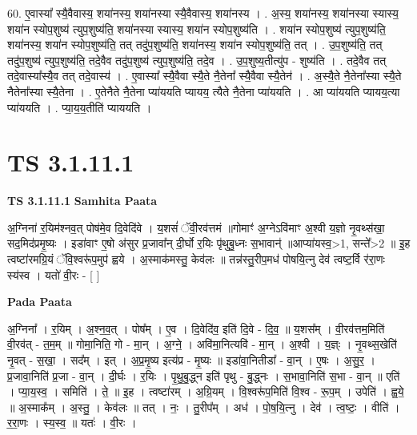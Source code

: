 \documentclass[17pt]{extarticle}
\begin{document}
60. ए॒वास्या᳚ स्यै॒वैवास्य॒ शया॑नस्य॒ शया॑नस्या स्यै॒वैवास्य॒ शया॑नस्य । . अ॒स्य॒ शया॑नस्य॒ शया॑नस्या स्यास्य॒ शया॑न स्योप॒शुष्य॑ त्युप॒शुष्य॑ति॒ शया॑नस्या स्यास्य॒ शया॑न स्योप॒शुष्य॑ति । . शया॑न स्योप॒शुष्य॑ त्युप॒शुष्य॑ति॒ शया॑नस्य॒ शया॑न स्योप॒शुष्य॑ति॒ तत् तदु॑प॒शुष्य॑ति॒ शया॑नस्य॒ शया॑न स्योप॒शुष्य॑ति॒ तत् । . उ॒प॒शुष्य॑ति॒ तत् तदु॑प॒शुष्य॑ त्युप॒शुष्य॑ति॒ तदे॒वैव तदु॑प॒शुष्य॑ त्युप॒शुष्य॑ति॒ तदे॒व । . उ॒प॒शुष्य॒तीत्यु॑प - शुष्य॑ति । . तदे॒वैव तत् तदे॒वास्या᳚स्यै॒व तत् तदे॒वास्य॑ । . ए॒वास्या᳚ स्यै॒वैवा स्यै॒ते नै॒तेना᳚ स्यै॒वैवा स्यै॒तेन॑ । . अ॒स्यै॒ते नै॒तेना᳚स्या स्यै॒ते नैतेना᳚स्या स्यै॒तेना । . ए॒तेनैते नै॒तेना प्या॑ययति प्यायय॒ त्यैते नै॒तेना प्या॑ययति । . आ प्या॑ययति प्यायय॒त्या प्या॑ययति । . प्या॒य॒य॒तीति॑ प्याययति । \newline
\pagebreak
{}

\section{ TS 3.1.11.1 }

\textbf{TS 3.1.11.1 } \newline
\textbf{Samhita Paata} \newline

अ॒ग्निना॑ र॒यिम॑श्नव॒त् पोष॑मे॒व दि॒वेदि॑वे । य॒शसं॑ ॅवी॒रव॑त्तमं ॥गोमाꣳ॑ अ॒ग्नेऽवि॑माꣳ अ॒श्वी य॒ज्ञो नृ॒वथ्स॑खा॒ सद॒मिद॑प्रमृ॒ष्यः । इडा॑वाꣳ ए॒षो अ॑सुर प्र॒जावा᳚न् दी॒र्घो र॒यिः पृ॑थुबु॒ध्नः स॒भावान्॑ ॥आप्या॑यस्व॒>1, सन्ते᳚>2 ॥ इ॒ह त्वष्टा॑रमग्रि॒यं ॅवि॒श्वरू॑प॒मुप॑ ह्वये । अ॒स्माक॑मस्तु॒ केव॑लः ॥ तन्न॑स्तु॒रीप॒मध॑ पोषयि॒त्नु देव॑ त्वष्ट॒र्वि र॑रा॒णः स्य॑स्व । यतो॑ वी॒रः - [  ] \newline

\textbf{Pada Paata} \newline

अ॒ग्निना᳚ । र॒यिम् । अ॒श्न॒व॒त् । पोष᳚म् । ए॒व । दि॒वेदि॑व॒ इति॑ दि॒वे - दि॒व॒ ॥ य॒शस᳚म् । वी॒रव॑त्तम॒मिति॑ वी॒रव॑त् - त॒म॒म् ॥ गोमा॒निति॒ गो - मा॒न् । अ॒ग्ने॒ । अवि॑मा॒नित्यवि॑ - मा॒न् । अ॒श्वी । य॒ज्ञ्ः । नृ॒वथ्स॒खेति॑ नृ॒वत् - स॒खा॒ । सद᳚म् । इत् । अ॒प्र॒मृ॒ष्य इत्य॑प्र - मृ॒ष्यः ॥ इडा॑वा॒नितीडा᳚ - वा॒न् । ए॒षः । अ॒सु॒र॒ । प्र॒जावा॒निति॑ प्र॒जा - वा॒न् । दी॒र्घः । र॒यिः । पृ॒थु॒बु॒द्ध्न इति॑ पृथु - बु॒द्ध्नः । स॒भावा॒निति॑ स॒भा - वा॒न् ॥ एति॑ । प्या॒य॒स्व॒ । समिति॑ । ते॒ ॥ इ॒ह । त्वष्टा॑रम् । अ॒ग्रि॒यम् । वि॒श्वरू॑प॒मिति॑ वि॒श्व - रू॒प॒म् । उपेति॑ । ह्व॒ये॒ ॥ अ॒स्माक᳚म् । अ॒स्तु॒ । केव॑लः ॥ तत् । नः॒ । तु॒रीप᳚म् । अध॑ । पो॒ष॒यि॒त्नु । देव॑ । त्व॒ष्टः॒ । वीति॑ । र॒रा॒णः । स्य॒स्व॒ ॥ यतः॑ । वी॒रः ।  \newline
\end{document}

